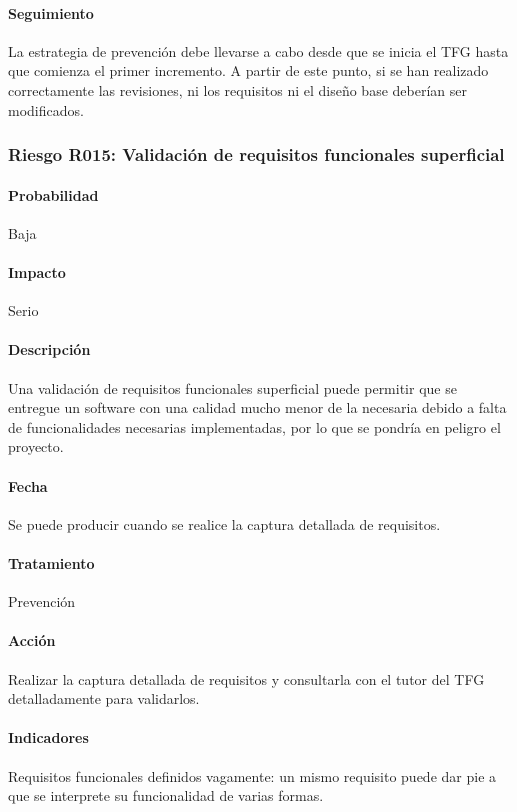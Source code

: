 \documentclass[10pt,a4paper]{article}
\begin{document}
				\paragraph{Seguimiento}	La estrategia de prevención debe llevarse a cabo desde que se inicia el TFG hasta que comienza el primer incremento. A partir de este punto, si se han realizado correctamente las revisiones, ni los requisitos ni el diseño base deberían ser modificados. 

			\subsubsection{Riesgo R015: Validación de requisitos funcionales superficial}
				\paragraph{Probabilidad} Baja
				\paragraph{Impacto}	Serio
				\paragraph{Descripción} Una validación de requisitos funcionales superficial puede permitir que se entregue un software con una calidad mucho menor de la necesaria debido a falta de funcionalidades necesarias implementadas, por lo que se pondría en peligro el proyecto. 
				\paragraph{Fecha} Se puede producir cuando se realice la captura detallada de requisitos. %
				\paragraph{Tratamiento} Prevención %
				\paragraph{Acción} Realizar la captura detallada de requisitos y consultarla con el tutor del TFG detalladamente para validarlos. %
				\paragraph{Indicadores} Requisitos funcionales definidos vagamente: un mismo requisito puede dar pie a que se interprete su funcionalidad de varias formas. %
\end{document}
